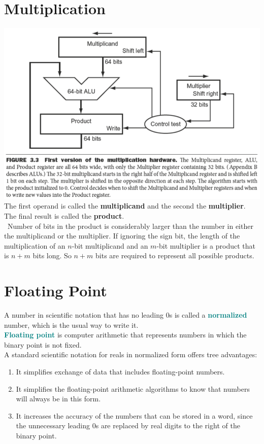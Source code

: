 \documentclass[12pt]{article}
\theoremstyle{definition}
\newcommand{\defnterm}[1]{\textbf{\textcolor{teal}{#1}}\index{#1}}
\begin{document}
  \section{Multiplication}
  \includegraphics[width=1.0\textwidth]{pictures/multiplication.png} \\
  The first operand is called the \textbf{multiplicand} and the second the \textbf{multiplier}.
  The final result is called the \textbf{product}. \\\
  Number of bits in the product is considerably larger than the number in either the multiplicand or the multiplier.
  If ignoring the sign bit, the length of the multiplication of an $n$-bit multiplicand and an $m$-bit multiplier is a product that is $n + m$ bits long.
  So $n + m$ bits are required to represent all possible products.

  \section{Floating Point}
  A number in scientific notation that has no leading 0s is called a \defnterm{normalized} number, which is the usual way to write it. \\
  \defnterm{Floating point} is computer arithmetic that represents numbers in which the binary point is not fixed. \\
  A standard scientific notation for reals in normalized form offers tree advantages:
  \begin{enumerate}
    \item It simplifies exchange of data that includes floating-point numbers.
    \item It simplifies the floating-point arithmetic algorithms to know that numbers will always be in this form.
    \item It increases the accuracy of the numbers that can be stored in a word, since the unnecessary leading 0s are replaced by real digits to the right of the binary point.
  \end{enumerate}
\end{document}
